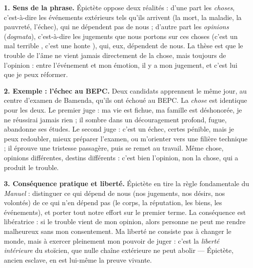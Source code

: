 \documentclass[11pt]{article}
\begin{document}
\begin{corrige}

\textbf{1. Sens de la phrase.} Épictète oppose deux réalités : d'une part les \emph{choses}, c'est-à-dire les événements extérieurs tels qu'ils arrivent (la mort, la maladie, la pauvreté, l'échec), qui ne dépendent pas de nous ; d'autre part les \emph{opinions} (\emph{dogmata}), c'est-à-dire les jugements que nous portons sur ces choses (\guillemotleft c'est un mal terrible \guillemotright, \guillemotleft c'est une honte \guillemotright), qui, eux, dépendent de nous. La thèse est que le trouble de l'âme ne vient jamais directement de la chose, mais toujours de l'opinion : entre l'événement et mon émotion, il y a mon jugement, et c'est lui que je peux réformer.

\textbf{2. Exemple : l'échec au BEPC.} Deux candidats apprennent le même jour, au centre d'examen de Bamenda, qu'ils ont échoué au BEPC. La \emph{chose} est identique pour les deux. Le premier juge : \guillemotleft ma vie est fichue, ma famille est déshonorée, je ne réussirai jamais rien \guillemotright{} ; il sombre dans un découragement profond, fugue, abandonne ses études. Le second juge : \guillemotleft c'est un échec, certes pénible, mais je peux redoubler, mieux préparer l'examen, ou m'orienter vers une filière technique \guillemotright{} ; il éprouve une tristesse passagère, puis se remet au travail. Même chose, opinions différentes, destins différents : c'est bien l'opinion, non la chose, qui a produit le trouble.

\textbf{3. Conséquence pratique et liberté.} Épictète en tire la règle fondamentale du \emph{Manuel} : distinguer ce qui dépend de nous (nos jugements, nos désirs, nos volontés) de ce qui n'en dépend pas (le corps, la réputation, les biens, les événements), et porter tout notre effort sur le premier terme. La conséquence est libératrice : si le trouble vient de mon opinion, alors personne ne peut me rendre malheureux sans mon consentement. Ma liberté ne consiste pas à changer le monde, mais à exercer pleinement mon pouvoir de juger : c'est la \emph{liberté intérieure} du stoïcien, que nulle chaîne extérieure ne peut abolir — Épictète, ancien esclave, en est lui-même la preuve vivante.

\end{corrige}
\end{document}
